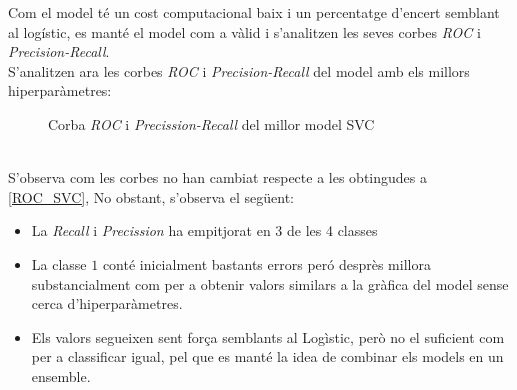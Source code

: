 \documentclass[a4paper, 11pt]{article}
\begin{document}
Com el model té un cost computacional baix i un percentatge d'encert semblant al logístic, es manté el model com a vàlid i s'analitzen les seves corbes \textit{ROC} i \textit{Precision-Recall}.\\
\hspace{-1.6em}S'analitzen ara les corbes \textit{ROC} i \textit{Precision-Recall} del model amb els millors hiperparàmetres:\\
\vspace{-2em}
\begin{figure}[h]
\centering
    \caption{Corba \textit{ROC} i \textit{Precission-Recall} del millor model SVC}
    \label{fig:my_label}
\end{figure}\\
S'observa com les corbes no han cambiat respecte a les obtingudes a \textcolor{blue}{\ref{ROC_SVC}}, 
No obstant, s'observa el següent:
\begin{itemize}
    \item La \textit{Recall} i \textit{Precission} ha empitjorat en 3 de les 4 classes
    \item La classe $1$ conté inicialment bastants errors peró desprès millora substancialment com per a obtenir valors similars a la gràfica del model sense cerca d'hiperparàmetres.
    \item Els valors segueixen sent força semblants al Logìstic, però no el suficient com per a classificar igual, pel que es manté la idea de combinar els models en un ensemble. 
\end{itemize}
\newpage
\end{document}
